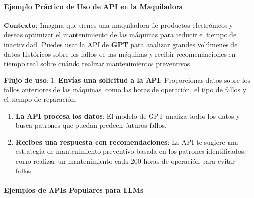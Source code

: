 \documentclass[
  10pt,
  letterpaper,
]{book}
\let\oldparagraph\paragraph
\renewcommand{\paragraph}[1]{\oldparagraph{#1}\mbox{}}
\begin{document}
\paragraph{\texorpdfstring{\textbf{Ejemplo Práctico de Uso de API en la
Maquiladora}}{Ejemplo Práctico de Uso de API en la Maquiladora}}\label{ejemplo-pruxe1ctico-de-uso-de-api-en-la-maquiladora}

\textbf{Contexto}: Imagina que tienes una maquiladora de productos
electrónicos y deseas optimizar el mantenimiento de las máquinas para
reducir el tiempo de inactividad. Puedes usar la API de \textbf{GPT}
para analizar grandes volúmenes de datos históricos sobre los fallos de
las máquinas y recibir recomendaciones en tiempo real sobre cuándo
realizar mantenimientos preventivos.

\textbf{Flujo de uso}: 1. \textbf{Envías una solicitud a la API}:
Proporcionas datos sobre los fallos anteriores de las máquinas, como las
horas de operación, el tipo de fallos y el tiempo de reparación.

\begin{enumerate}
\def\labelenumi{\arabic{enumi}.}
\setcounter{enumi}{1}
\item
  \textbf{La API procesa los datos}: El modelo de GPT analiza todos los
  datos y busca patrones que puedan predecir futuros fallos.
\item
  \textbf{Recibes una respuesta con recomendaciones}: La API te sugiere
  una estrategia de mantenimiento preventivo basada en los patrones
  identificados, como realizar un mantenimiento cada 200 horas de
  operación para evitar fallos.
\end{enumerate}

\paragraph{\texorpdfstring{\textbf{Ejemplos de APIs Populares para
LLMs}}{Ejemplos de APIs Populares para LLMs}}\label{ejemplos-de-apis-populares-para-llms}
\end{document}
